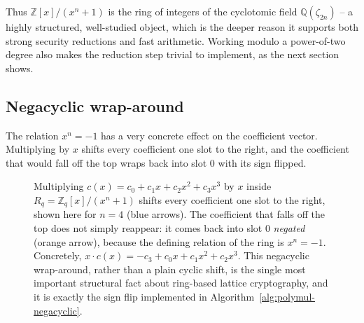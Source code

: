 Thus $\mathbb{Z}[x]/(x^n+1)$ is the ring of integers of the cyclotomic field $\mathbb{Q}(\zeta_{2n})$ -- a highly structured, well-studied object, which is the deeper reason it supports both strong security reductions and fast arithmetic. Working modulo a power-of-two degree also makes the reduction step trivial to implement, as the next section shows.

\subsection{Negacyclic wrap-around}
The relation $x^n=-1$ has a very concrete effect on the coefficient vector. Multiplying by $x$ shifts every coefficient one slot to the right, and the coefficient that would fall off the top wraps back into slot $0$ with its sign flipped.

\begin{figure}[H]
\centering
{}
\caption{Multiplying $c(x)=c_0+c_1x+c_2x^2+c_3x^3$ by $x$ inside $R_q=\mathbb{Z}_q[x]/(x^n+1)$ shifts every coefficient one slot to the right, shown here for $n=4$ (blue arrows). The coefficient that falls off the top does not simply reappear: it comes back into slot $0$ \emph{negated} (orange arrow), because the defining relation of the ring is $x^n=-1$. Concretely, $x\cdot c(x) = -c_3 + c_0x + c_1x^2 + c_2x^3$. This negacyclic wrap-around, rather than a plain cyclic shift, is the single most important structural fact about ring-based lattice cryptography, and it is exactly the sign flip implemented in Algorithm~\ref{alg:polymul-negacyclic}.}
\label{fig:negacyclic-wrap}
\end{figure}

